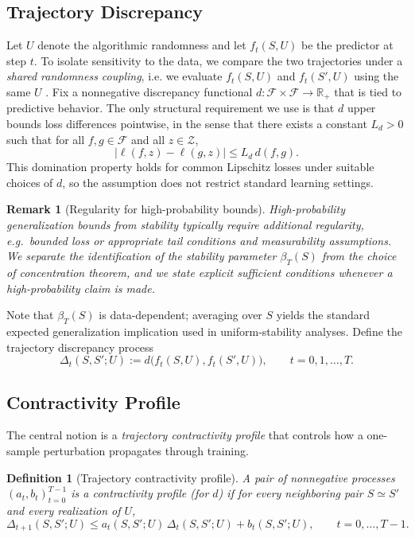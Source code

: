 \documentclass{article}
\newtheorem{definition}[theorem]{Definition}
\newtheorem{remark}[theorem]{Remark}
\numberwithin{equation}{section}
\begin{document}
\subsection{Trajectory Discrepancy}
\label{subsec:discrepancy}

Let $U$ denote the algorithmic randomness and let $f_t(S,U)$ be the predictor at step $t$. To isolate sensitivity to the data, we compare the two trajectories under a \emph{shared randomness coupling}, i.e. we evaluate $f_t(S,U)$ and $f_t(S',U)$ using the same $U$ \cite{pmlr-v48-hardt16}. Fix a nonnegative discrepancy functional $d:\mathcal{F}\times\mathcal{F}\to\mathbb{R}_+$ that is tied to predictive behavior. The only structural requirement we use is that $d$ upper bounds loss differences pointwise, in the sense that there exists a constant $L_d>0$ such that for all $f,g\in\mathcal{F}$ and all $z\in\mathcal{Z}$,
\begin{equation}
	\label{eq:loss-dominated-by-d}
	\big|\ell(f,z)-\ell(g,z)\big|\le L_d\, d(f,g).
\end{equation}
This domination property holds for common Lipschitz losses under suitable choices of $d$, so the assumption does not restrict standard learning settings.
\begin{remark}[Regularity for high-probability bounds]
	High-probability generalization bounds from stability typically require additional regularity, e.g.\ bounded loss or appropriate tail conditions and measurability assumptions. We separate the identification of the stability parameter $\beta_T(S)$ from the choice of concentration theorem, and we state explicit sufficient conditions whenever a high-probability claim is made. \end{remark}
	
	
Note that $\beta_T(S)$ is data-dependent; averaging over $S$ yields the standard expected generalization implication used in uniform-stability analyses. Define the trajectory discrepancy process
\[
\Delta_t(S,S';U) := d\!\big(f_t(S,U),f_t(S',U)\big),\qquad t=0,1,\dots,T.
\]

\subsection{Contractivity Profile}
\label{subsec:contractivity}

The central notion is a \emph{trajectory contractivity profile} that controls how a one-sample perturbation propagates through training.

\begin{definition}[Trajectory contractivity profile]
	\label{def:contractivity-profile}
	A pair of nonnegative processes $(a_t,b_t)_{t=0}^{T-1}$ is a contractivity profile (for $d$) if for every neighboring pair $S\simeq S'$ and every realization of $U$,
	\begin{equation}
		\label{eq:contractivity}
		\Delta_{t+1}(S,S';U)\le a_t(S,S';U)\,\Delta_t(S,S';U)+b_t(S,S';U),
		\qquad t=0,\dots,T-1.
	\end{equation}
\end{definition}
\end{document}
